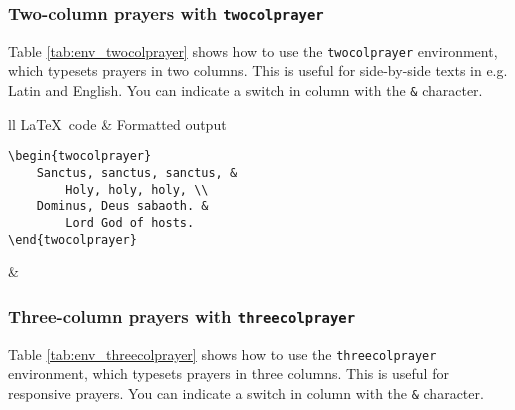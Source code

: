\documentclass{article}
\begin{document}
\subsubsection{Two-column prayers with \lstinline{twocolprayer}}

Table \ref{tab:env_twocolprayer} shows how to use the \lstinline{twocolprayer} environment, which typesets prayers in two columns. This is useful for side-by-side texts in e.g. Latin and English. You can indicate a switch in column with the \lstinline{&} character.

\begin{table}[h!]
\centering
\begin{tabular}{ll}
\toprule
\LaTeX\ code & Formatted output \\
\midrule
\begin{lstlisting}
\begin{twocolprayer}
	Sanctus, sanctus, sanctus, &
		Holy, holy, holy, \\
	Dominus, Deus sabaoth. &
		Lord God of hosts.
\end{twocolprayer}
\end{lstlisting}
&
\\
\bottomrule
\end{tabular}
\caption{The \lstinline{twocolprayer} environment.}
\label{tab:env_twocolprayer}
\end{table}

\subsubsection{Three-column prayers with \lstinline{threecolprayer}}

Table \ref{tab:env_threecolprayer} shows how to use the \lstinline{threecolprayer} environment, which typesets prayers in three columns. This is useful for responsive prayers. You can indicate a switch in column with the \lstinline{&} character.
\end{document}
